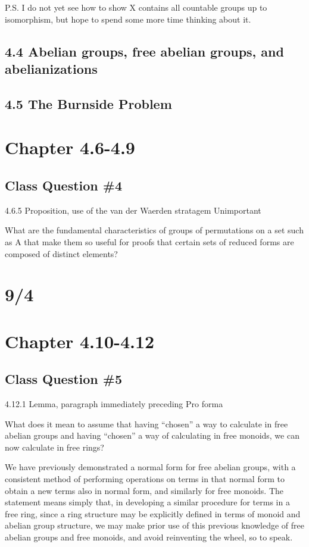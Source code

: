 \documentclass[12pt]{article}
\begin{document}
P.S. I do not yet see how to show X contains all countable groups up to isomorphism, but hope to spend some more time thinking about it.


\subsection{4.4 Abelian groups, free abelian groups, and abelianizations}

\subsection{4.5 The Burnside Problem}

\section{Chapter 4.6-4.9}

\subsection{Class Question \#4}

4.6.5 Proposition, use of the van der Waerden stratagem
Unimportant

What are the fundamental characteristics of groups of permutations on a set such as A that make them so useful for proofs that certain sets of reduced forms are composed of distinct elements?

\section{9/4}

\section{Chapter 4.10-4.12}

\subsection{Class Question \#5}

4.12.1 Lemma, paragraph immediately preceding
Pro forma

What does it mean to assume that having ``chosen'' a way to calculate in free abelian groups and having ``chosen'' a way of calculating in free monoids, we can now calculate in free rings?

We have previously demonstrated a normal form for free abelian groups, with a consistent method of performing operations on terms in that normal form to obtain a new terms also in normal form, and similarly for free monoids.  The statement means simply that, in developing a similar procedure for terms in a free ring, since a ring structure may be explicitly defined in terms of monoid and abelian group structure, we may make prior use of this previous knowledge of free abelian groups and free monoids, and avoid reinventing the wheel, so to speak.
\end{document}
